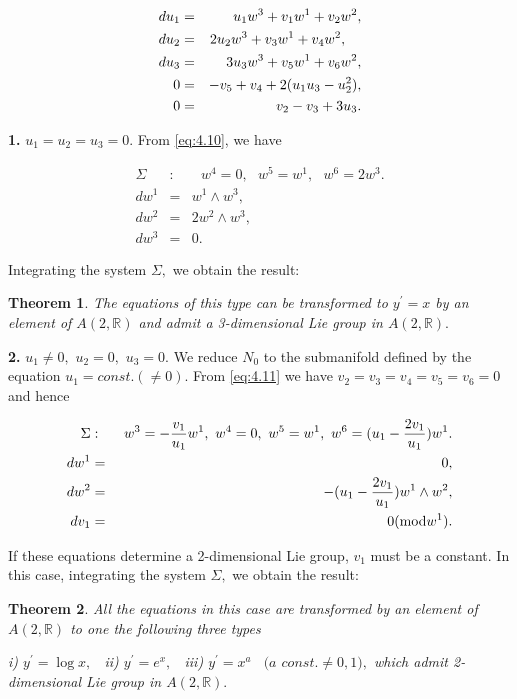 \documentclass{amsproc}
\newtheorem{theorem}{Theorem}[section]
\theoremstyle{remark}
\numberwithin{equation}{section}
\begin{document}
\begin{eqnarray}
du_{1} &=&u_{1}w^{3}+v_{1}w^{1}+v_{2}w^{2}, \notag \\
du_{2} &=&2u_{2}w^{3}+v_{3}w^{1}+v_{4}w^{2},
\label{eq:4.11}
 \text{ \ \ } \\
du_{3} &=&3u_{3}w^{3}+v_{5}w^{1}+v_{6}w^{2}, \notag \\
0 &=&-v_{5}+v_{4}+2(u_{1}u_{3}-u_{2}^{2}), \notag \\
0 &=&v_{2}-v_{3}+3u_{3}. \notag
\end{eqnarray}

\textbf{1. }$u_{1}=u_{2}=u_{3}=0.$ From \eqref{eq:4.10}, we have

\begin{eqnarray*}
\Sigma &:&\text{ }w^{4}=0,\text{ }w^{5}=w^{1},\text{ }w^{6}=2w^{3}. \\
dw^{1} &=&w^{1}\wedge w^{3}, \\
dw^{2} &=&2w^{2}\wedge w^{3}, \\
dw^{3} &=&0.
\end{eqnarray*}

Integrating the system $\Sigma ,$ we obtain the result:

\begin{theorem}
The equations of this type can be transformed to $y^{\prime }=x$ by an
element of $A(2,\mathbb{R}
)$ and admit a 3-dimensional Lie group in $A(2,\mathbb{R}
).$
\end{theorem}

\textbf{2. }$u_{1}\neq 0,$ $u_{2}=0,$ $u_{3}=0.$ We reduce $N_{0}$ to the
submanifold defined by the equation $u_{1}=const.(\neq 0).$ From \eqref{eq:4.11}
we have $v_{2}=v_{3}=v_{4}=v_{5}=v_{6}=0$ and hence

\begin{eqnarray*}
\Sigma &:&\text{ }w^{3}=-\frac{v_{1}}{u_{1}}w^{1},\text{ }w^{4}=0,\text{ }w^{5}=w^{1},\text{ }w^{6}=(u_{1}-\frac{2v_{1}}{u_{1}})w^{1}. \\
dw^{1} &=&0, \\
dw^{2} &=&-(u_{1}-\frac{2v_{1}}{u_{1}})w^{1}\wedge w^{2}, \\
dv_{1} &=&0({\mathop{\mbox{\rm {mod}}}}w^{1}).
\end{eqnarray*}

If these equations determine a 2-dimensional Lie group, $v_{1}$ must be a
constant. In this case, integrating the system $\Sigma ,$ we obtain the
result:

\begin{theorem}
All the equations in this case are transformed by an element of $A(2,\mathbb{R}
)$ to one the following three types

i) $y^{\prime }=\log x,$ \ ii) $y^{\prime }=e^{x},$ \ iii) $y^{\prime
}=x^{a} $ \ $(a$ $const.\neq 0,1),$ which admit 2-dimensional Lie group in $A(2,\mathbb{R}
).$
\end{theorem}
\end{document}
